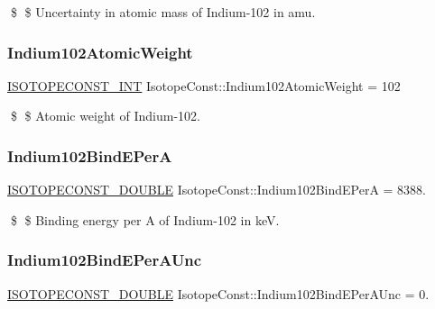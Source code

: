 \$ \$ Uncertainty in atomic mass of Indium-\/102 in amu. \mbox{\label{group___isotope_const-_indium-_in102_ga15af0fb4bacbf7e71e43ac396f235cf8}} 
\subsubsection{\texorpdfstring{Indium102\+Atomic\+Weight}{Indium102AtomicWeight}}
{\footnotesize\ttfamily \mbox{\hyperlink{group___isotope_const-_macros_ga5f18360b3e99483a35c32d789e62621c}{I\+S\+O\+T\+O\+P\+E\+C\+O\+N\+S\+T\+\_\+\+I\+NT}} Isotope\+Const\+::\+Indium102\+Atomic\+Weight = 102}

\$ \$ Atomic weight of Indium-\/102. \mbox{\label{group___isotope_const-_indium-_in102_ga89e59494bfa632d906badf8137ce0576}} 
\subsubsection{\texorpdfstring{Indium102\+Bind\+E\+PerA}{Indium102BindEPerA}}
{\footnotesize\ttfamily \mbox{\hyperlink{group___isotope_const-_macros_ga8f45a7272ce02c0b4c65c44636ed719a}{I\+S\+O\+T\+O\+P\+E\+C\+O\+N\+S\+T\+\_\+\+D\+O\+U\+B\+LE}} Isotope\+Const\+::\+Indium102\+Bind\+E\+PerA = 8388.}

\$ \$ Binding energy per A of Indium-\/102 in keV. \mbox{\label{group___isotope_const-_indium-_in102_gac3d92385e281bcf355d1b416856dc5ca}} 
\subsubsection{\texorpdfstring{Indium102\+Bind\+E\+Per\+A\+Unc}{Indium102BindEPerAUnc}}
{\footnotesize\ttfamily \mbox{\hyperlink{group___isotope_const-_macros_ga8f45a7272ce02c0b4c65c44636ed719a}{I\+S\+O\+T\+O\+P\+E\+C\+O\+N\+S\+T\+\_\+\+D\+O\+U\+B\+LE}} Isotope\+Const\+::\+Indium102\+Bind\+E\+Per\+A\+Unc = 0.}

